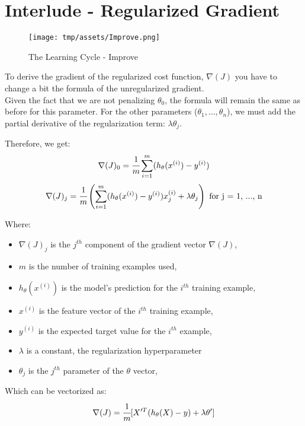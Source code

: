 \documentclass[]{article}
\begin{document}
\clearpage

\hypertarget{interlude---regularized-gradient-1}{%
\section{Interlude - Regularized
Gradient}\label{interlude---regularized-gradient-1}}

\begin{figure}
\centering
\texttt{[image: tmp/assets/Improve.png]}
\caption{The Learning Cycle - Improve}
\end{figure}

To derive the gradient of the regularized cost function, \(\nabla(J)\)
you have to change a bit the formula of the unregularized gradient.\\
Given the fact that we are not penalizing \(\theta_0\), the formula will
remain the same as before for this parameter. For the other parameters
(\(\theta_1, \dots, \theta_n\)), we must add the partial derivative of
the regularization term: \(\lambda \theta_j\).

Therefore, we get: \large \[
\nabla(J)_0 = \cfrac{1}{m}\sum_{i=1}^{m}(h_\theta(x^{(i)}) - y^{(i)})
\] \normalsize \large \[
\nabla(J)_j = \cfrac{1}{m}\left(\sum_{i=1}^{m}(h_\theta(x^{(i)}) - y^{(i)})x_j^{(i)} + \lambda \theta_j\right) \text{ for j = 1, ..., n}
\] \normalsize

Where:

\begin{itemize}
\item
  \(\nabla(J)_j\) is the \(j^{th}\) component of the gradient vector
  \(\nabla(J)\),
\item
  \(m\) is the number of training examples used,
\item
  \(h_\theta(x^{(i)})\) is the model's prediction for the \(i^{th}\)
  training example,
\item
  \(x^{(i)}\) is the feature vector of the \(i^{th}\) training example,
\item
  \(y^{(i)}\) is the expected target value for the \(i^{th}\) example,
\item
  \(\lambda\) is a constant, the regularization hyperparameter
\item
  \(\theta_j\) is the \(j^{th}\) parameter of the \(\theta\) vector,
\end{itemize}

Which can be vectorized as: \large \[
\nabla(J) = \cfrac{1}{m} [X'^T(h_\theta(X) - y) + \lambda \theta']
\] \normalsize
\end{document}
